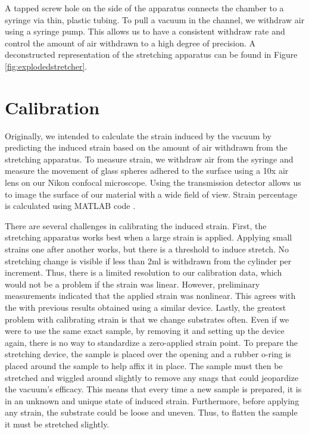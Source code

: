 A tapped screw hole on the side of the apparatus connects the chamber to a syringe via thin, plastic tubing. To pull a vacuum in the channel, we withdraw air using a syringe pump. This allows us to have a consistent withdraw rate and control the amount of air withdrawn to a high degree of precision. A deconstructed representation of the stretching apparatus can be found in Figure \ref{fig:explodedstretcher}.

\section{Calibration}
Originally, we intended to calculate the strain induced by the vacuum by predicting the induced strain based on the amount of air withdrawn from the stretching apparatus. To measure strain, we withdraw air from the syringe and measure the movement of glass spheres adhered to the surface using a 10x air lens on our Nikon confocal microscope. Using the transmission detector allows us to image the surface of our material with a wide field of view. Strain percentage is calculated using MATLAB code \cite{xu2017direct}.

There are several challenges in calibrating the induced strain. First, the stretching apparatus works best when a large strain is applied. Applying small strains one after another works, but there is a threshold to induce stretch. No stretching change is visible if less than 2ml is withdrawn from the cylinder per increment. Thus, there is a limited resolution to our calibration data, which would not be a problem if the strain was linear. However, preliminary measurements indicated that the applied strain was nonlinear. This agrees with the with previous results \cite{na2008time} obtained using a similar device. Lastly, the greatest problem with calibrating strain is that we change substrates often. Even if we were to use the same exact sample, by removing it and setting up the device again, there is no way to standardize a zero-applied strain point. To prepare the stretching device, the sample is placed over the opening and a rubber o-ring is placed around the sample to help affix it in place. The sample must then be stretched and wiggled around slightly to remove any snags that could jeopardize the vacuum's efficacy. This means that every time a new sample is prepared, it is in an unknown and unique state of induced strain. Furthermore, before applying any strain, the substrate could be loose and uneven. Thus, to flatten the sample it must be stretched slightly.

